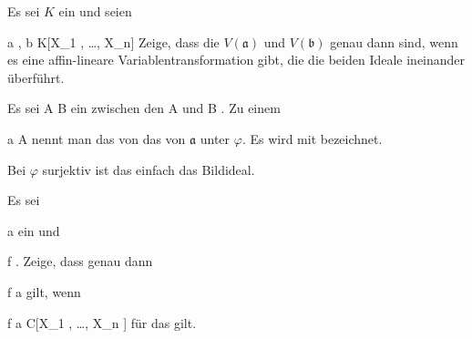 {}
{





Es sei $K$ ein
und seien

\mavergleichskette
{\vergleichskette
{ {\mathfrak a} , {\mathfrak b}
}
{ \subseteq }{ K[X_1 , \ldots ,  X_n] }
{  }{}
{    }{}
{   }{}
}
{}{}{}
Zeige, dass die
$V( {\mathfrak a} )$ und $V( {\mathfrak b} )$ genau dann
sind, wenn es eine affin-lineare Variablentransformation gibt, die die beiden Ideale ineinander überführt.





}
{} {}







Es sei
\maabbdisp {\varphi} { A } { B
} {}
ein
zwischen den
\mathkor {} {A} {und} {B} {.}
Zu einem

\mavergleichskette
{\vergleichskette
{ {\mathfrak a}
}
{ \subseteq }{ A
}
{  }{
}
{    }{
}
{   }{}
}
{}{}{}
nennt man das von
das
von ${\mathfrak a}$ unter $\varphi$. Es wird mit
 bezeichnet.






Bei $\varphi$ surjektiv ist das einfach das Bildideal.

{}
{





Es sei

\mavergleichskette
{\vergleichskette
{ {\mathfrak a}
}
{ \subseteq }{ \R[X_1 , \ldots , X_n ]
}
{  }{
}
{    }{
}
{   }{
}
}
{}{}{}
ein
und

\mavergleichskette
{\vergleichskette
{ f
}
{ \in }{ \R[X_1 , \ldots , X_n ]
}
{  }{
}
{    }{
}
{   }{
}
}
{}{}{.}
Zeige, dass genau dann

\mavergleichskette
{\vergleichskette
{ f
}
{ \in }{ {\mathfrak a}
}
{  }{
}
{    }{
}
{   }{
}
}
{}{}{}
gilt, wenn

\mavergleichskette
{\vergleichskette
{ f
}
{ \in }{ {\mathfrak a} {\mathbb C}[X_1 , \ldots , X_n ]
}
{  }{
}
{    }{
}
{   }{
}
}
{}{}{}
für das
gilt.





}
{} {}

